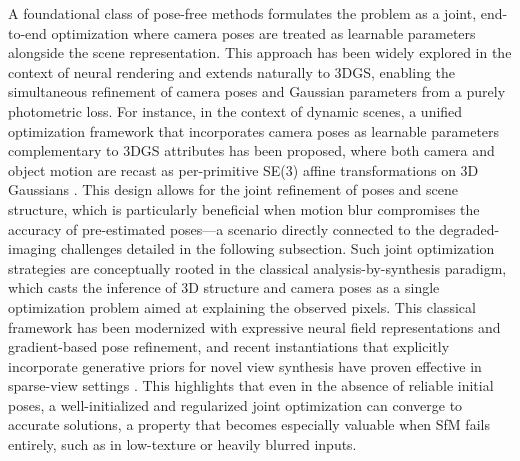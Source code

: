 \documentclass[11pt]{article}
\begin{document}
A foundational class of pose-free methods formulates the problem as a joint, end-to-end optimization where camera poses are treated as learnable parameters alongside the scene representation. This approach has been widely explored in the context of neural rendering and extends naturally to 3DGS, enabling the simultaneous refinement of camera poses and Gaussian parameters from a purely photometric loss. For instance, in the context of dynamic scenes, a unified optimization framework that incorporates camera poses as learnable parameters complementary to 3DGS attributes has been proposed, where both camera and object motion are recast as per-primitive SE(3) affine transformations on 3D Gaussians \cite{ref271}. This design allows for the joint refinement of poses and scene structure, which is particularly beneficial when motion blur compromises the accuracy of pre-estimated poses---a scenario directly connected to the degraded-imaging challenges detailed in the following subsection. Such joint optimization strategies are conceptually rooted in the classical analysis-by-synthesis paradigm, which casts the inference of 3D structure and camera poses as a single optimization problem aimed at explaining the observed pixels. This classical framework has been modernized with expressive neural field representations and gradient-based pose refinement, and recent instantiations that explicitly incorporate generative priors for novel view synthesis have proven effective in sparse-view settings \cite{ref272}. This highlights that even in the absence of reliable initial poses, a well-initialized and regularized joint optimization can converge to accurate solutions, a property that becomes especially valuable when SfM fails entirely, such as in low-texture or heavily blurred inputs.
\end{document}
